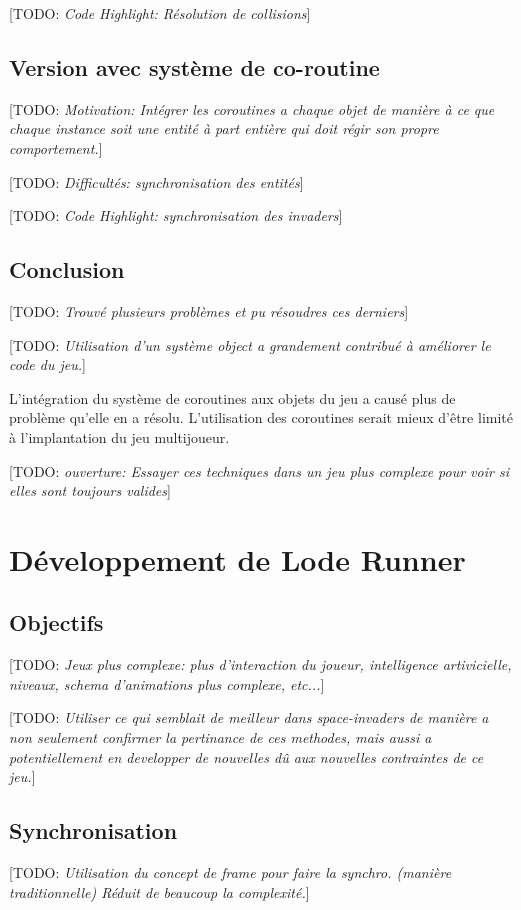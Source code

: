 \documentclass[12pt,oneside,letterpaper,francais]{book}
\newcommand{\todo}[1]{[TODO: {\it #1}]}
\begin{document}
\todo{Code Highlight: Résolution de collisions}


\subsection{Version avec système de co-routine}
\todo{Motivation: Intégrer les coroutines a chaque objet de manière à
  ce que chaque instance soit une entité à part entière qui doit régir
  son propre comportement.}

\todo{Difficultés: synchronisation des entités}

\todo{Code Highlight: synchronisation des invaders}


\subsection{Conclusion}
\todo{Trouvé plusieurs problèmes et pu résoudres ces derniers}

\todo{Utilisation d'un système object a grandement contribué à
  améliorer le code du jeu.}

L'intégration du système de coroutines aux objets du jeu a causé plus
de problème qu'elle en a résolu. L'utilisation des coroutines serait
mieux d'être limité à l'implantation du jeu multijoueur.

\todo{ouverture: Essayer ces techniques dans un jeu plus complexe pour
  voir si elles sont toujours valides}


\section{Développement de \og Lode Runner \fg}
\subsection{Objectifs}
\todo{Jeux plus complexe: plus d'interaction du joueur, intelligence
  artivicielle, niveaux, schema d'animations plus complexe, etc...}

\todo{Utiliser ce qui semblait de meilleur dans space-invaders de
  manière a non seulement confirmer la pertinance de ces methodes,
  mais aussi a potentiellement en developper de nouvelles dû aux
  nouvelles contraintes de ce jeu.}

\subsection{Synchronisation}
\todo{Utilisation du concept de frame pour faire la synchro. (manière
  traditionnelle) Réduit de beaucoup la complexité.}
\end{document}
